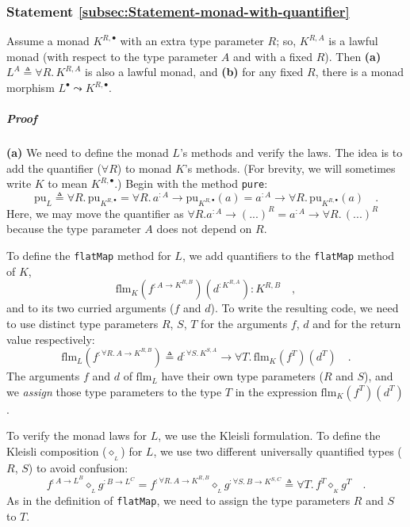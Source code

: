 \subsubsection{Statement \label{subsec:Statement-monad-with-quantifier}\ref{subsec:Statement-monad-with-quantifier} }

Assume a monad $K^{R,\bullet}$ with an extra type parameter $R$;
so, $K^{R,A}$ is a lawful monad (with respect to the type parameter
$A$ and with a fixed $R$). Then \textbf{(a)} $L^{A}\triangleq\forall R.\,K^{R,A}$
is also a lawful monad, and \textbf{(b)} for any fixed $R$, there
is a monad morphism $L^{\bullet}\leadsto K^{R,\bullet}$.

\subparagraph{Proof}

\textbf{(a)} We need to define the monad $L$\textsf{'}s methods and verify
the laws. The idea is to add the quantifier ($\forall R$) to monad
$K$\textsf{'}s methods. (For brevity, we will sometimes write $K$ to mean
$K^{R,\bullet}$.) Begin with the method \lstinline!pure!:
\[
\text{pu}_{L}\triangleq\forall R.\,\text{pu}_{K^{R,\bullet}}=\forall R.\,a^{:A}\rightarrow\text{pu}_{K^{R,\bullet}}(a)=a^{:A}\rightarrow\forall R.\,\text{pu}_{K^{R,\bullet}}(a)\quad.
\]
Here, we may move the quantifier as $\forall R.a^{:A}\rightarrow(...)^{R}=a^{:A}\rightarrow\forall R.\,(...)^{R}$
because the type parameter $A$ does not depend on $R$.

To define the \lstinline!flatMap! method for $L$, we add quantifiers
to the \lstinline!flatMap! method of $K$,
\[
\text{flm}_{K}(f^{:A\rightarrow K^{R,B}})(d^{:K^{R,A}}):K^{R,B}\quad,
\]
and to its two curried arguments ($f$ and $d$). To write the resulting
code, we need to use distinct type parameters $R$, $S$, $T$ for
the arguments $f$, $d$ and for the return value respectively: 
\[
\text{flm}_{L}(f^{:\forall R.\,A\rightarrow K^{R,B}})\triangleq d^{:\forall S.\,K^{S,A}}\rightarrow\forall T.\,\text{flm}_{K}(f^{T})(d^{T})\quad.
\]
The arguments $f$ and $d$ of $\text{flm}_{L}$ have their own type
parameters ($R$ and $S$), and we \emph{assign} those type parameters
to the type $T$ in the expression $\text{flm}_{K}(f^{T})(d^{T})$.

To verify the monad laws for $L$, we use the Kleisli formulation.
To define the Kleisli composition ($\diamond_{_{L}}$) for $L$, we
use two different universally quantified types ($R$, $S$) to avoid
confusion:
\[
f^{:A\rightarrow L^{B}}\diamond_{_{L}}g^{:B\rightarrow L^{C}}=f^{:\forall R.\,A\rightarrow K^{R,B}}\diamond_{_{L}}g^{:\forall S.\,B\rightarrow K^{S,C}}\triangleq\forall T.\,f^{T}\diamond_{_{K}}g^{T}\quad.
\]
As in the definition of \lstinline!flatMap!, we need to assign the
type parameters $R$ and $S$ to $T$. 

